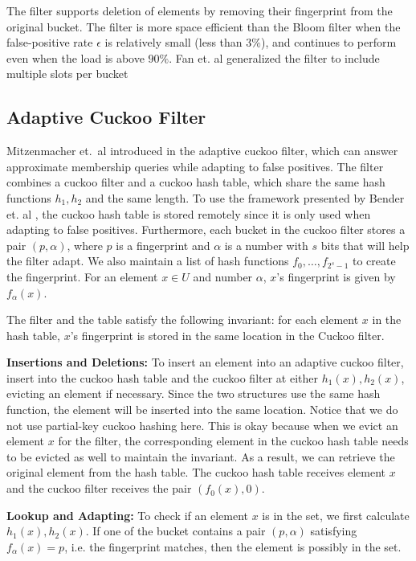 \documentclass[../paper.tex]{subfiles}
\begin{document}
The filter supports deletion of elements by removing their fingerprint from the original bucket. The filter is more space efficient than the Bloom filter when the false-positive rate $\epsilon$ is relatively small (less than $3\%$), and continues to perform even when the load is above $90\%$.
Fan et. al generalized the filter to include multiple slots per bucket

\subsection{Adaptive Cuckoo Filter}
Mitzenmacher et.\ al introduced in \cite{adaptive-cuckoo} the adaptive cuckoo filter, which can answer approximate membership queries while adapting to false positives. The filter combines a cuckoo filter and a cuckoo hash table,
which share the same hash functions $h_1,h_2$ and the same length. To use the framework presented by Bender et. al \cite{broom-filter}, the cuckoo hash table is stored remotely since it is only used when adapting to false positives.
Furthermore, each bucket in the cuckoo filter stores a pair $(p,\alpha)$, where $p$ is a fingerprint and $\alpha$ is a number with $s$ bits that will help the filter adapt. We also maintain a list of hash functions $f_0,\ldots,f_{2^s-1}$ to create the fingerprint. For an element $x\in U$ and number $\alpha$, $x$'s fingerprint is given by $f_\alpha(x)$.

The filter and the table satisfy the following invariant: for each element $x$ in the hash table, $x$'s fingerprint is stored in the same location in the Cuckoo filter.

\textbf{Insertions and Deletions:} To insert an element into an adaptive cuckoo filter, insert into the cuckoo hash table and the cuckoo filter at either $h_1(x),h_2(x)$, evicting an element if necessary.
Since the two structures use the same hash function, the element will be inserted into the same location. Notice that we do not use partial-key cuckoo hashing here. This is okay because when we evict an element $x$ for the filter, the corresponding element in the cuckoo hash table needs to be evicted as well
to maintain the invariant. As a result, we can retrieve the original element from the hash table.  The cuckoo hash table receives element $x$ and the cuckoo filter receives the pair $(f_0(x),0)$.

\textbf{Lookup and Adapting:} To check if an element $x$ is in the set, we first calculate $h_1(x), h_2(x)$. If one of the bucket contains a pair $(p,\alpha)$ satisfying $f_\alpha(x)=p$, i.e. the fingerprint matches, then the element is possibly in the set.
\end{document}
